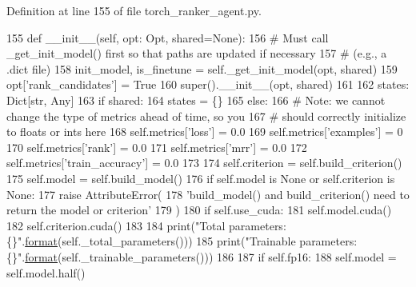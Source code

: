Definition at line 155 of file torch\+\_\+ranker\+\_\+agent.\+py.


\begin{DoxyCode}
155     \textcolor{keyword}{def }\_\_init\_\_(self, opt: Opt, shared=\textcolor{keywordtype}{None}):
156         \textcolor{comment}{# Must call \_get\_init\_model() first so that paths are updated if necessary}
157         \textcolor{comment}{# (e.g., a .dict file)}
158         init\_model, is\_finetune = self.\_get\_init\_model(opt, shared)
159         opt[\textcolor{stringliteral}{'rank\_candidates'}] = \textcolor{keyword}{True}
160         super().\_\_init\_\_(opt, shared)
161 
162         states: Dict[str, Any]
163         \textcolor{keywordflow}{if} shared:
164             states = \{\}
165         \textcolor{keywordflow}{else}:
166             \textcolor{comment}{# Note: we cannot change the type of metrics ahead of time, so you}
167             \textcolor{comment}{# should correctly initialize to floats or ints here}
168             self.metrics[\textcolor{stringliteral}{'loss'}] = 0.0
169             self.metrics[\textcolor{stringliteral}{'examples'}] = 0
170             self.metrics[\textcolor{stringliteral}{'rank'}] = 0.0
171             self.metrics[\textcolor{stringliteral}{'mrr'}] = 0.0
172             self.metrics[\textcolor{stringliteral}{'train\_accuracy'}] = 0.0
173 
174             self.criterion = self.build\_criterion()
175             self.model = self.build\_model()
176             \textcolor{keywordflow}{if} self.model \textcolor{keywordflow}{is} \textcolor{keywordtype}{None} \textcolor{keywordflow}{or} self.criterion \textcolor{keywordflow}{is} \textcolor{keywordtype}{None}:
177                 \textcolor{keywordflow}{raise} AttributeError(
178                     \textcolor{stringliteral}{'build\_model() and build\_criterion() need to return the model or criterion'}
179                 )
180             \textcolor{keywordflow}{if} self.use\_cuda:
181                 self.model.cuda()
182                 self.criterion.cuda()
183 
184             print(\textcolor{stringliteral}{"Total parameters: \{\}"}.\hyperlink{namespaceparlai_1_1chat__service_1_1services_1_1messenger_1_1shared__utils_a32e2e2022b824fbaf80c747160b52a76}{format}(self.\_total\_parameters()))
185             print(\textcolor{stringliteral}{"Trainable parameters:  \{\}"}.\hyperlink{namespaceparlai_1_1chat__service_1_1services_1_1messenger_1_1shared__utils_a32e2e2022b824fbaf80c747160b52a76}{format}(self.\_trainable\_parameters()))
186 
187             \textcolor{keywordflow}{if} self.fp16:
188                 self.model = self.model.half()

\end{DoxyCode}
